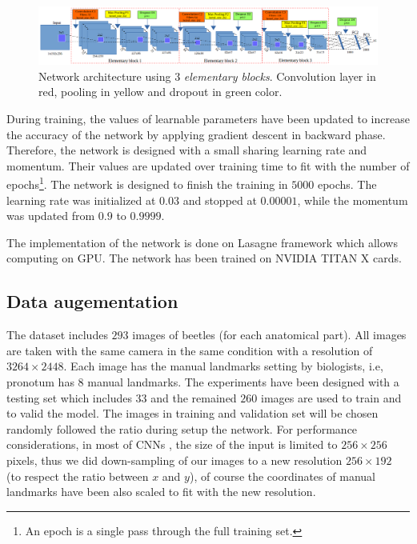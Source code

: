 \documentclass[10pt]{article}
\begin{document}
\begin{figure}[!t]
\centering
\includegraphics[scale=0.32]{images/arch_model}
\caption{{\small{Network architecture using $3$ \textit{elementary blocks}.
  Convolution
  layer in red, pooling in yellow and dropout in green color.}}} 
\label{cnnnetwork2}
\end{figure}

During training, the values of learnable parameters have been updated
to increase the accuracy of the network by applying gradient descent
in backward phase. Therefore, the network is designed with a small
sharing learning rate and momentum. Their values are updated over
training time to fit with the number of epochs\footnote{An epoch is a
  single pass through the full training set.}. The network is designed
to finish the training in $5000$ epochs. The learning rate was
initialized at $0.03$ and stopped at $0.00001$, while the momentum was
updated from $0.9$ to $0.9999$.


The implementation of the network is done
on Lasagne framework \cite{lasagne} which allows computing on GPU. The
network has been trained on NVIDIA TITAN X cards.


\subsection{Data augementation}
\label{sec_data}
The dataset includes $293$ images of beetles (for each anatomical part). All
images are taken with the same camera in the same condition with a
resolution of $3264 \times 2448$. Each image has the manual
landmarks setting by biologists, i.e, pronotum has $8$ manual landmarks. The
experiments have been designed with a testing set which includes $33$
and the remained $260$ images are used to train and to valid the model.
The images in training and validation set will be chosen randomly followed
the ratio during setup the network. For performance considerations, in most of CNNs
\cite{lecun2010convolutional, sun2013deep,  krizhevsky2012imagenet,
  cintas2016automatic}, the size of the input is limited to $256
\times 256$ pixels, thus we did down-sampling of our images to a new
resolution $256 \times 192$ (to respect the ratio between $x$ and
$y$), of course the coordinates of manual landmarks have been also
scaled to fit with the new resolution.
\end{document}
